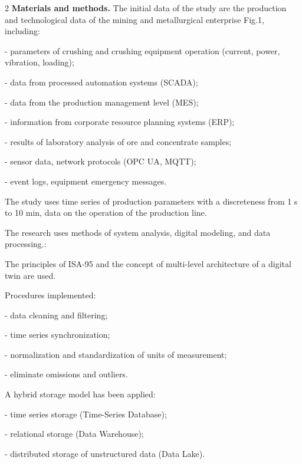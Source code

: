 \begin{multicols}{2}
{\bfseries Materials and methods.} The initial data of the study are the production
and technological data of the mining and metallurgical enterprise Fig.1,
including:

- parameters of crushing and crushing equipment operation (current,
power, vibration, loading);

- data from processed automation systems (SCADA);

- data from the production management level (MES);

- information from corporate resource planning systems (ERP);

- results of laboratory analysis of ore and concentrate samples;

- sensor data, network protocols (OPC UA, MQTT);

- event logs, equipment emergency messages.

The study uses time series of production parameters with a discreteness
from 1 s to 10 min, data on the operation of the production line.

The research uses methods of system analysis, digital modeling, and data
processing.:

The principles of ISA-95 and the concept of multi-level architecture of
a digital twin are used.

Procedures implemented:

- data cleaning and filtering;

- time series synchronization;

- normalization and standardization of units of measurement;

- eliminate omissions and outliers.

A hybrid storage model has been applied:

- time series storage (Time-Series Database);

- relational storage (Data Warehouse);

- distributed storage of unstructured data (Data Lake).
\end{multicols}
\vspace{-1cm}
\begin{figs}
\end{figs}

\begin{figs}
\end{figs}

